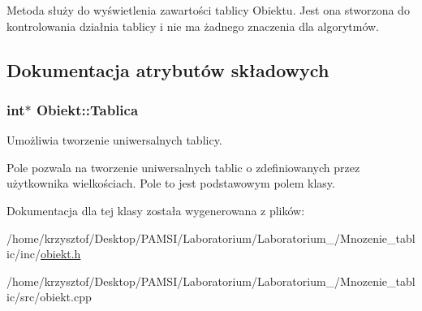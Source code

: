 \-Metoda służy do wyświetlenia zawartości tablicy \-Obiektu. \-Jest ona stworzona do kontrolowania działnia tablicy i nie ma żadnego znaczenia dla algorytmów. 

\subsection{\-Dokumentacja atrybutów składowych}
\hypertarget{class_obiekt_a877ac2b65043327767012c184067f269}{
\subsubsection[{\-Tablica}]{\setlength{\rightskip}{0pt plus 5cm}int$\ast$ {\bf \-Obiekt\-::\-Tablica}}}\label{class_obiekt_a877ac2b65043327767012c184067f269}


\-Umożliwia tworzenie uniwersalnych tablicy. 

\-Pole pozwala na tworzenie uniwersalnych tablic o zdefiniowanych przez użytkownika wielkościach. \-Pole to jest podstawowym polem klasy. 

\-Dokumentacja dla tej klasy została wygenerowana z plików\-:\begin{DoxyCompactItemize}
\item 
/home/krzysztof/\-Desktop/\-P\-A\-M\-S\-I/\-Laboratorium/\-Laboratorium\-\_/\-Mnozenie\-\_\-tablic/inc/\hyperlink{obiekt_8h}{obiekt.\-h}\item 
/home/krzysztof/\-Desktop/\-P\-A\-M\-S\-I/\-Laboratorium/\-Laboratorium\-\_/\-Mnozenie\-\_\-tablic/src/obiekt.\-cpp\end{DoxyCompactItemize}
